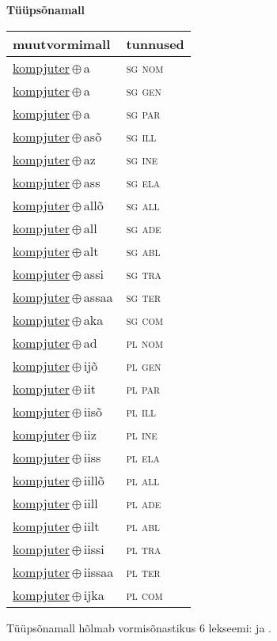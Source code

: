 

\vspace{3.5em}
\noindent \begin{minipage}{\textwidth}
\noindent \textbf{Tüüpsõnamall \,}\\

\begin{sideways}
\begin{tabular}{l l}
muutvormimall & tunnused \\
\hline
\underline{kompjuter}\,$\oplus$\,a & \textsc{ sg nom } \\
\underline{kompjuter}\,$\oplus$\,a & \textsc{ sg gen } \\
\underline{kompjuter}\,$\oplus$\,a & \textsc{ sg par } \\
\underline{kompjuter}\,$\oplus$\,asõ & \textsc{ sg ill } \\
\underline{kompjuter}\,$\oplus$\,az & \textsc{ sg ine } \\
\underline{kompjuter}\,$\oplus$\,ass & \textsc{ sg ela } \\
\underline{kompjuter}\,$\oplus$\,allõ & \textsc{ sg all } \\
\underline{kompjuter}\,$\oplus$\,all & \textsc{ sg ade } \\
\underline{kompjuter}\,$\oplus$\,alt & \textsc{ sg abl } \\
\underline{kompjuter}\,$\oplus$\,assi & \textsc{ sg tra } \\
\underline{kompjuter}\,$\oplus$\,assaa & \textsc{ sg ter } \\
\underline{kompjuter}\,$\oplus$\,aka & \textsc{ sg com } \\
\underline{kompjuter}\,$\oplus$\,ad & \textsc{ pl nom } \\
\underline{kompjuter}\,$\oplus$\,ijõ & \textsc{ pl gen } \\
\underline{kompjuter}\,$\oplus$\,iit & \textsc{ pl par } \\
\underline{kompjuter}\,$\oplus$\,iisõ & \textsc{ pl ill } \\
\underline{kompjuter}\,$\oplus$\,iiz & \textsc{ pl ine } \\
\underline{kompjuter}\,$\oplus$\,iiss & \textsc{ pl ela } \\
\underline{kompjuter}\,$\oplus$\,iillõ & \textsc{ pl all } \\
\underline{kompjuter}\,$\oplus$\,iill & \textsc{ pl ade } \\
\underline{kompjuter}\,$\oplus$\,iilt & \textsc{ pl abl } \\
\underline{kompjuter}\,$\oplus$\,iissi & \textsc{ pl tra } \\
\underline{kompjuter}\,$\oplus$\,iissaa & \textsc{ pl ter } \\
\underline{kompjuter}\,$\oplus$\,ijka & \textsc{ pl com } \\
\end{tabular}
\end{sideways}
\label{tab:tüüpsõnamall-kompjutera}

\end{minipage}

 
\vspace{1em}
\noindent Tüüpsõnamall  hõlmab vormisõnastikus 6 lekseemi:  ja .
